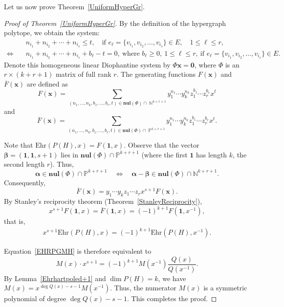 \documentclass[reqno, 12pt]{amsart}
\theoremstyle{mydefinition}
\theoremstyle{myremark}
\begin{document}
Let us now prove Theorem~\ref{UniformHyperGr}.
\begin{proof}[Proof of Theorem~\ref{UniformHyperGr}]
By the definition of the hypergraph polytope, we obtain the system:
\begin{align*}
&n_{i_1} + n_{i_2} + \cdots + n_{i_s} \leq t, \quad \text{if  } e_\ell=\{v_{i_1}, v_{i_2}, \ldots, v_{i_s}\} \in E,\quad 1 \leq \ell \leq r, \\
\Longleftrightarrow \quad & n_{i_1} + n_{i_2} + \cdots + n_{i_s} + b_{\ell} - t = 0,\ \text{where } b_{\ell} \geq 0,\ 1 \leq \ell \leq r,\ \text{if }e_\ell=\{v_{i_1}, v_{i_2}, \ldots, v_{i_s}\} \in E.
\end{align*}
Denote this homogeneous linear Diophantine system by $\Phi \mathbf{x} = \mathbf{0}$, where $\Phi$ is an $r \times (k + r + 1)$ matrix of full rank $r$. The generating functions $F(\mathbf{x})$ and $\overline{F}(\mathbf{x})$ are defined as
\[
F(\mathbf{x}) = \sum_{(n_1,\ldots,n_k, b_1,\ldots,b_r,t) \in \mathbf{nul}(\Phi) \cap \; \mathbb{N}^{k+r+1}} y_1^{n_1} \cdots y_k^{n_k} z_1^{b_1} \cdots z_r^{b_r} x^t
\]
and
\[
\overline{F}(\mathbf{x}) = \sum_{(n_1,\ldots,n_k, b_1,\ldots,b_r,t) \in \mathbf{nul}(\Phi) \cap \; \mathbb{P}^{k+r+1}} y_1^{n_1} \cdots y_k^{n_k} z_1^{b_1} \cdots z_r^{b_r} x^t.
\]

Note that $\mathrm{Ehr}(P(H), x) = F(\mathbf{1}, x)$. Observe that the vector $\boldsymbol{\beta} = (\boldsymbol{1}, \boldsymbol{1}, s+1)$ lies in $\mathbf{nul}(\Phi) \cap \mathbb{P}^{k+r+1}$ (where the first $\boldsymbol{1}$ has length $k$, the second length $r$). Thus,
\[
\boldsymbol{\alpha} \in \mathbf{nul}(\Phi) \cap \mathbb{P}^{k+r+1} \quad \Longleftrightarrow \quad \boldsymbol{\alpha} - \boldsymbol{\beta} \in \mathbf{nul}(\Phi) \cap \mathbb{N}^{k+r+1}.
\]
Consequently,
\[
\overline{F}(\mathbf{x}) = y_1 \cdots y_k z_1 \cdots z_r x^{s+1} F(\mathbf{x}).
\]
By Stanley's reciprocity theorem (Theorem~\ref{StanleyReciprocity}),
\[
x^{s+1} F(\mathbf{1}, x) = \overline{F}(\mathbf{1}, x) = (-1)^{k+1} F(\mathbf{1}, x^{-1}),
\]
that is,
\begin{align}\label{EHRPGMH}
x^{s+1} \mathrm{Ehr}(P(H), x) = (-1)^{k+1} \mathrm{Ehr}(P(H), x^{-1}).
\end{align}


Equation~\eqref{EHRPGMH} is therefore equivalent to
\[
M(x) \cdot x^{s+1} = (-1)^{k+1} M(x^{-1}) \frac{Q(x)}{Q(x^{-1})}.
\]
By Lemma~\ref{Ehrhartpoled+1} and $\dim P(H)=k$, we have $M(x) = x^{\deg Q(x) - s - 1} M(x^{-1})$.
Thus, the numerator $M(x)$ is a symmetric polynomial of degree $\deg Q(x) - s - 1$.
This completes the proof.
\end{proof}
\end{document}
